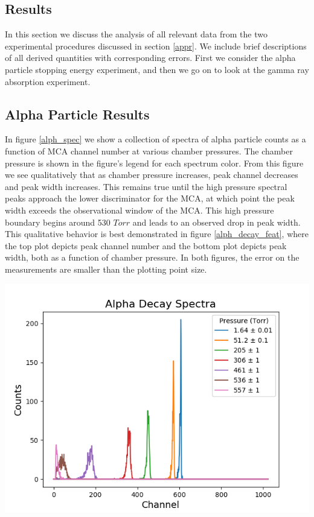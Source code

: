 \documentclass[10pt]{article}
\newenvironment{Figure}
{\par\medskip\noindent\minipage{\linewidth}}
{\endminipage\par\medskip}
\begin{document}
\begin{multicols}{2}
\section{Results} \label{res}

In this section we discuss the analysis of all relevant data from the two experimental procedures discussed in section \ref{appr}.  We include brief descriptions of all derived quantities with corresponding errors.  First we consider the alpha particle stopping energy experiment, and then we go on to look at the gamma ray absorption experiment.

\subsection{Alpha Particle Results} \label{res_alpha}

In figure \ref{alph_spec} we show a collection of spectra of alpha particle counts as a function of MCA channel number at various chamber pressures. The chamber pressure is shown in the figure's legend for each spectrum color.  From this figure we see qualitatively that as chamber pressure increases, peak channel decreases and peak width increases.  This remains true until the high pressure spectral peaks approach the lower discriminator for the MCA, at which point the peak width exceeds the observational window of the MCA.  This high pressure boundary begins around 530 $Torr$ and leads to an observed drop in peak width.  This qualitative behavior is best demonstrated in figure \ref{alph_decay_feat}, where the top plot depicts peak channel number and the bottom plot depicts peak width, both as a function of chamber pressure.  In both figures, the error on the measurements are smaller than the plotting point size.

\begin{Figure}
	\includegraphics[width=\textwidth,keepaspectratio]{spectra_samples.png}
\end{Figure} 


\end{multicols}
\end{document}
